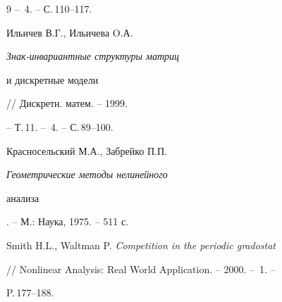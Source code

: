\begin{thebibliography}{9}
-- \No\,4. -- С.\,110--117. 




Ильичев В.Г., Ильичева O.А. {\em Знак-инвариантные структуры матриц 


и дискретные модели} // Дискретн. матем. -- 1999. 


-- Т.\,11. -- \No\,4. -- С.\,89--100. 




Красносельский М.А., Забрейко П.П. {\em Геометрические методы нелинейного 


анализа}. -- М.: Наука, 1975. -- 511 с. 




Smith H.L., Waltman P. {\em Competition in the periodic gradostat} 


// Nonlinear Analysis: Real World Application. -- 2000. -- \No\,1. -- 


P.\,177--188. 


 


\end{thebibliography} 


 


\vskip 0.5cm 


 








 


\label{end} 


 


